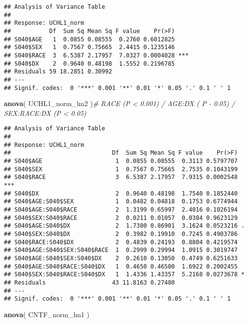 \documentclass[]{article}
\newenvironment{Shaded}{\begin{snugshade}}{\end{snugshade}}
\newcommand{\CommentTok}[1]{\textcolor[rgb]{0.56,0.35,0.01}{\textit{#1}}}
\newcommand{\KeywordTok}[1]{\textcolor[rgb]{0.13,0.29,0.53}{\textbf{#1}}}
\newcommand{\NormalTok}[1]{#1}
\begin{document}
\begin{verbatim}
## Analysis of Variance Table
## 
## Response: UCHL1_norm
##           Df  Sum Sq Mean Sq F value    Pr(>F)    
## S040$AGE   1  0.0855 0.08555  0.2760 0.6012825    
## S040$SEX   1  0.7567 0.75665  2.4415 0.1235146    
## S040$RACE  3  6.5387 2.17957  7.0327 0.0004028 ***
## S040$DX    2  0.9640 0.48198  1.5552 0.2196785    
## Residuals 59 18.2851 0.30992                      
## ---
## Signif. codes:  0 '***' 0.001 '**' 0.01 '*' 0.05 '.' 0.1 ' ' 1
\end{verbatim}

\begin{Shaded}
\begin{Highlighting}[]
\KeywordTok{anova}\NormalTok{(  UCHL1_norm_lm2  )}\CommentTok{# RACE (P < 0.001) / AGE:DX ( P - 0.05) / SEX:RACE:DX (P < 0.05)}
\end{Highlighting}
\end{Shaded}

\begin{verbatim}
## Analysis of Variance Table
## 
## Response: UCHL1_norm
##                             Df  Sum Sq Mean Sq F value    Pr(>F)    
## S040$AGE                     1  0.0855 0.08555  0.3113 0.5797707    
## S040$SEX                     1  0.7567 0.75665  2.7535 0.1043199    
## S040$RACE                    3  6.5387 2.17957  7.9315 0.0002548 ***
## S040$DX                      2  0.9640 0.48198  1.7540 0.1852440    
## S040$AGE:S040$SEX            1  0.0482 0.04818  0.1753 0.6774944    
## S040$AGE:S040$RACE           2  1.3199 0.65997  2.4016 0.1026194    
## S040$SEX:S040$RACE           2  0.0211 0.01057  0.0384 0.9623129    
## S040$AGE:S040$DX             2  1.7380 0.86901  3.1624 0.0523216 .  
## S040$SEX:S040$DX             2  0.3982 0.19910  0.7245 0.4903786    
## S040$RACE:S040$DX            2  0.4839 0.24193  0.8804 0.4219574    
## S040$AGE:S040$SEX:S040$RACE  1  0.2999 0.29994  1.0915 0.3019747    
## S040$AGE:S040$SEX:S040$DX    2  0.2610 0.13050  0.4749 0.6251633    
## S040$AGE:S040$RACE:S040$DX   1  0.4650 0.46500  1.6922 0.2002455    
## S040$SEX:S040$RACE:S040$DX   1  1.4336 1.43357  5.2168 0.0273678 *  
## Residuals                   43 11.8163 0.27480                      
## ---
## Signif. codes:  0 '***' 0.001 '**' 0.01 '*' 0.05 '.' 0.1 ' ' 1
\end{verbatim}

\begin{Shaded}
\begin{Highlighting}[]
\KeywordTok{anova}\NormalTok{(  CNTF_norm_lm1   )}
\end{Highlighting}
\end{Shaded}
\end{document}
